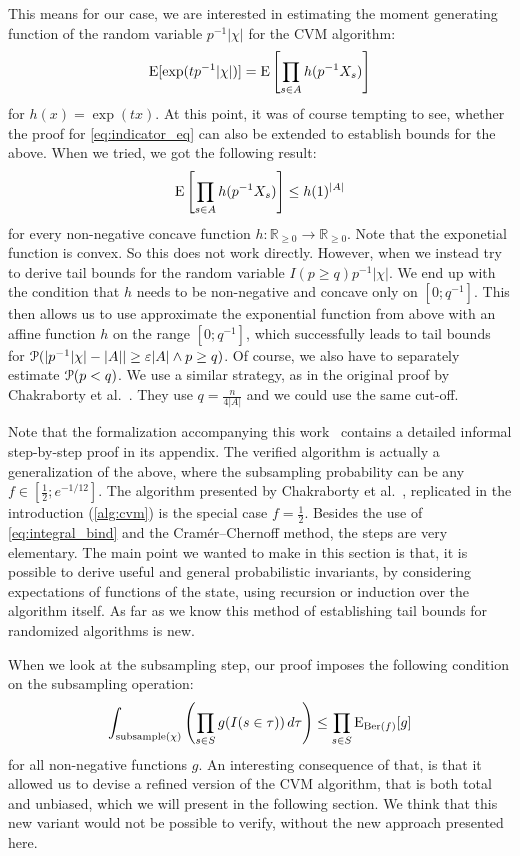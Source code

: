 This means for our case, we are interested in estimating the moment generating function of the random variable $p^{-1} |\chi|$ for the CVM algorithm:
\[
  \operatorname{\mathrm{E}} [\exp( t p^{-1} |\chi| )] = \operatorname{\mathrm{E}} \left[ \prod_{s \in A} h(p^{-1} X_s) \right]
\]
for $h(x) = \exp(tx)$.
At this point, it was of course tempting to see, whether the proof for \cref{eq:indicator_eq} can also be extended to establish bounds for the above.
When we tried, we got the following result:
\[
  \operatorname{\mathrm{E}} \left[ \prod_{s \in A} h(p^{-1} X_s) \right] \leq h(1)^{|A|}
\]
for every non-negative concave function $h : \mathbb R_{\geq 0} \rightarrow \mathbb R_{\geq 0}$.
Note that the exponetial function is convex.
So this does not work directly.
However, when we instead try to derive tail bounds for the random variable $I(p \geq q) p^{-1} |\chi|$.
We end up with the condition that $h$ needs to be non-negative and concave only on $[0;q^{-1}]$.
This then allows us to use approximate the exponential function from above with an affine function $h$ on the range $[0;q^{-1}]$, which successfully leads to tail bounds for $\operatorname{\mathcal P}( |p^{-1} |\chi| - |A|| \geq \varepsilon |A| \wedge p \geq q)$.
Of course, we also have to separately estimate $\operatorname{\mathcal P}(p < q)$.
We use a similar strategy, as in the original proof by Chakraborty et al.~\cite{chakraborty2022}.
They use $q = \frac{n}{4 |A|}$ and we could use the same cut-off.

Note that the formalization accompanying this work~\todo{[cite]} contains a detailed informal step-by-step proof in its appendix.
The verified algorithm is actually a generalization of the above, where the subsampling probability can be any $f \in [\frac{1}{2};e^{-1/12}]$.
The algorithm presented by Chakraborty et al.~\cite{chakraborty2022}, replicated in the introduction (\cref{alg:cvm}) is the special case $f=\frac{1}{2}$.
Besides the use of \cref{eq:integral_bind} and the Cram\'er--Chernoff method, the steps are very elementary.
The main point we wanted to make in this section is that, it is possible to derive useful and general probabilistic invariants, by considering expectations of functions of the state, using recursion or induction over the algorithm itself.
As far as we know this method of establishing tail bounds for randomized algorithms is new.

When we look at the subsampling step, our proof imposes the following condition on the subsampling operation:
\begin{equation}\label{eq:subsample_condition}
  \int_{\mathrm{subsample}(\chi)} \left(\prod_{s \in S} g(I(s \in \tau)) \, d \tau\right) \leq \prod_{s \in S} \operatorname{\mathrm{E}}_{\operatorname{\mathrm{Ber}}(f)} [g]
\end{equation}
for all non-negative functions $g$.
An interesting consequence of that, is that it allowed us to devise a refined version of the CVM algorithm, that is both total and unbiased, which we will present in the following section.
We think that this new variant would not be possible to verify, without the new approach presented here.
